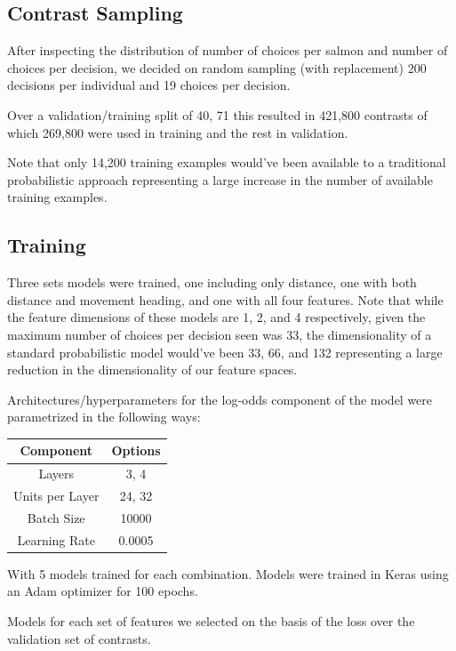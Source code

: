 \documentclass[11pt]{article}
\begin{document}
\subsection*{Contrast Sampling}

After inspecting the distribution of number of choices per salmon and number of choices per decision, we decided on random sampling (with replacement) 200 decisions per individual and 19 choices per decision. 

Over a validation/training split of 40, 71 this resulted in 421,800 contrasts of which 269,800 were used in training and the rest in validation. 

Note that only 14,200 training examples would've been available to a traditional probabilistic approach representing a large increase in the number of available training examples.   

\subsection*{Training}

Three sets models were trained, one including only distance, one with both distance and movement heading, and one with all four features. Note that while the feature dimensions of these models are 1, 2, and 4 respectively, given the maximum number of choices per decision seen was 33, the dimensionality of a standard probabilistic model would've been 33, 66, and 132 representing a large reduction in the dimensionality of our feature spaces. 

Architectures/hyperparameters for the log-odds component of the model were parametrized in the following ways:

\begin{center}
\begin{tabular}{| c | c |} 
\hline 
Component & Options \\
\hline
Layers & 3, 4 \\ 
Units per Layer & 24, 32 \\
Batch Size & 10000 \\
Learning Rate & 0.0005 \\
\hline
\end{tabular}
\end{center}

With 5 models trained for each combination. Models were trained in Keras using an Adam optimizer for 100 epochs. 

Models for each set of features we selected on the basis of the loss over the validation set of contrasts. 
\end{document}
